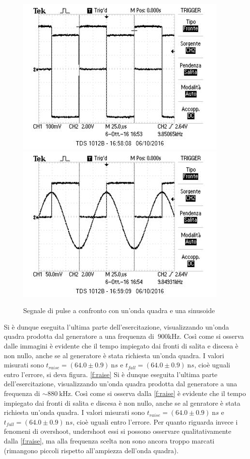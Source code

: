 \documentclass[10pt,a4paper]{article}
\begin{document}
\begin{figure}[h]
	\centering
	\includegraphics[scale=0.6]{../Oscilloscopio/trig_pulse_square.jpg}
	\includegraphics[scale=0.6]{../Oscilloscopio/trig_pulse_sin.jpg}
	\caption{Segnale di pulse a confronto con un'onda quadra e una sinusoide}
	\label{f:pulse}
\end{figure}

Si è dunque eseguita l'ultima parte dell'esercitazione, visualizzando un'onda quadra prodotta dal generatore a una frequenza di $~900 \text{kHz}$.
Così come si osserva dalle immagini è evidente che il tempo impiegato dai fronti di salita e discesa è non nullo, anche se al generatore è stata richiesta un'onda quadra. I valori misurati sono $t_{raise} = (64.0 \pm 0.9 )~\text{n}s$ e $t_{fall} = (64.0 \pm 0.9)~\text{n}s$, cioè uguali entro l'errore, si deva figura. \figurename{\ref{f:raise}}
Si è dunque eseguita l'ultima parte dell'esercitazione, visualizzando un'onda quadra prodotta dal generatore a una frequenza di $\sim880~\text{kHz}$.
Così come si osserva dalla \figurename{\ref{f:raise}} è evidente che il tempo impiegato dai fronti di salita e discesa è non nullo, anche se al genratore è stata richiesta un'onda quadra. I valori misurati sono $t_{raise} = (64.0 \pm 0.9 )~\text{n}s$ e $t_{fall} = (64.0 \pm 0.9)~\text{n}s$, cioè uguali entro l'errore. %
Per quanto riguarda invece i fenomeni di overshoot, undershoot essi si possono osservare qualitativamente dalla \figurename{\ref{f:raise}}, ma alla frequenza scelta non sono ancora troppo marcati (rimangono piccoli rispetto all'ampiezza dell'onda quadra).
\end{document}
